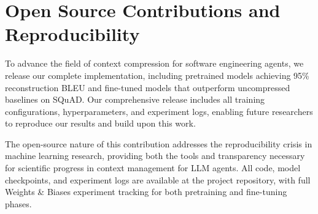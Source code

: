 \section{Open Source Contributions and Reproducibility}

To advance the field of context compression for software engineering agents, we release our complete implementation, including pretrained models achieving 95\% reconstruction BLEU and fine-tuned models that outperform uncompressed baselines on SQuAD. Our comprehensive release includes all training configurations, hyperparameters, and experiment logs, enabling future researchers to reproduce our results and build upon this work.

The open-source nature of this contribution addresses the reproducibility crisis in machine learning research, providing both the tools and transparency necessary for scientific progress in context management for LLM agents. All code, model checkpoints, and experiment logs are available at the project repository, with full Weights \& Biases experiment tracking for both pretraining and fine-tuning phases.